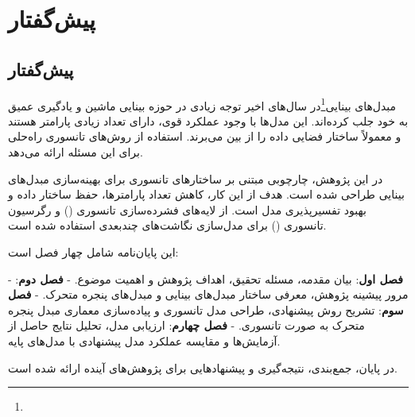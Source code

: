 \chapter*{پیش‌گفتار}
{}



\section*{پیش‌گفتار}

مبدل‌های بینایی\footnote{}در سال‌های اخیر توجه زیادی در حوزه بینایی ماشین و یادگیری عمیق به خود جلب کرده‌اند. این مدل‌ها با وجود عملکرد قوی، دارای تعداد زیادی پارامتر هستند و معمولاً ساختار فضایی داده را از بین می‌برند. استفاده از روش‌های تانسوری راه‌حلی برای این مسئله ارائه می‌دهد.

در این پژوهش، چارچوبی مبتنی بر ساختارهای تانسوری برای بهینه‌سازی مبدل‌های بینایی طراحی شده است. هدف از این کار، کاهش تعداد پارامترها، حفظ ساختار داده و بهبود تفسیرپذیری مدل است. از لایه‌های فشرده‌سازی تانسوری () و رگرسیون تانسوری () برای مدل‌سازی نگاشت‌های چندبعدی استفاده شده است.

این پایان‌نامه شامل چهار فصل است:

- \textbf{فصل اول}: بیان مقدمه، مسئله تحقیق، اهداف پژوهش و اهمیت موضوع.
- \textbf{فصل دوم}: مرور پیشینه پژوهش، معرفی ساختار مبدل‌های بینایی و مبدل‌های پنجره متحرک.
- \textbf{فصل سوم}: تشریح روش پیشنهادی، طراحی مدل تانسوری و پیاده‌سازی معماری مبدل پنجره متحرک به صورت تانسوری.
- \textbf{فصل چهارم}: ارزیابی مدل، تحلیل نتایج حاصل از آزمایش‌ها و مقایسه عملکرد مدل پیشنهادی با مدل‌های پایه.

در پایان، جمع‌بندی، نتیجه‌گیری و پیشنهادهایی برای پژوهش‌های آینده ارائه شده است.




